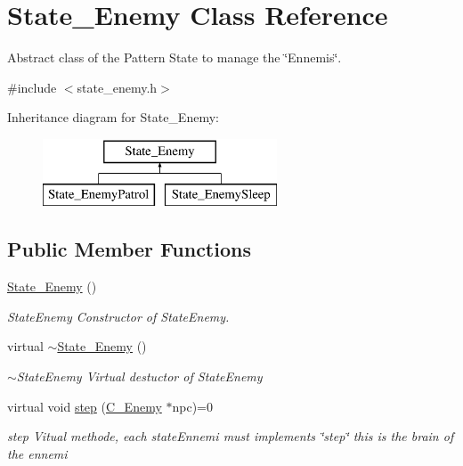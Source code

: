 \hypertarget{class_state___enemy}{}\section{State\+\_\+\+Enemy Class Reference}
\label{class_state___enemy}


Abstract class of the Pattern State to manage the \char`\"{}\+Ennemis\char`\"{}.  




{\ttfamily \#include $<$state\+\_\+enemy.\+h$>$}

Inheritance diagram for State\+\_\+\+Enemy\+:\begin{figure}[H]
\begin{center}
\leavevmode
\includegraphics[height=2.000000cm]{class_state___enemy}
\end{center}
\end{figure}
\subsection*{Public Member Functions}
\begin{DoxyCompactItemize}
\item 
\hypertarget{class_state___enemy_a3e56cab4668c0c539388c309bcc9f7dc}{}\hyperlink{class_state___enemy_a3e56cab4668c0c539388c309bcc9f7dc}{State\+\_\+\+Enemy} ()\label{class_state___enemy_a3e56cab4668c0c539388c309bcc9f7dc}

\begin{DoxyCompactList}\small\item\em State\+Enemy Constructor of State\+Enemy. \end{DoxyCompactList}\item 
\hypertarget{class_state___enemy_a081b9ebdc5c03fd0adf82cb53a4d61b6}{}virtual \hyperlink{class_state___enemy_a081b9ebdc5c03fd0adf82cb53a4d61b6}{$\sim$\+State\+\_\+\+Enemy} ()\label{class_state___enemy_a081b9ebdc5c03fd0adf82cb53a4d61b6}

\begin{DoxyCompactList}\small\item\em $\sim$\+State\+Enemy Virtual destuctor of State\+Enemy \end{DoxyCompactList}\item 
virtual void \hyperlink{class_state___enemy_a5f55ff045d530b5fda0b976a0b83d71a}{step} (\hyperlink{class_c___enemy}{C\+\_\+\+Enemy} $\ast$npc)=0
\begin{DoxyCompactList}\small\item\em step Vitual methode, each state\+Ennemi must implements \char`\"{}step\char`\"{} this is the brain of the ennemi \end{DoxyCompactList}\end{DoxyCompactItemize}


